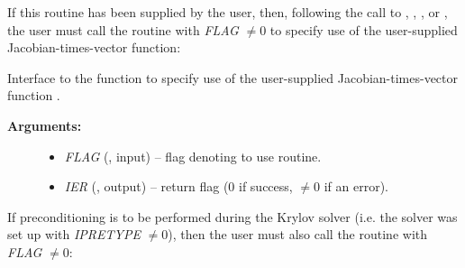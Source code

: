 \documentclass[letterpaper,10pt,english]{sphinxmanual}
\begin{document}
If this routine has been supplied by the user, then, following the
call to {\hyperref[f_interface/Usage:f/_/FARKSPGMR]{}}, {\hyperref[f_interface/Usage:f/_/FARKSPBCG]{}},
{\hyperref[f_interface/Usage:f/_/FARKSPTFQMR]{}}, {\hyperref[f_interface/Usage:f/_/FARKSPFGMR]{}} or
{\hyperref[f_interface/Usage:f/_/FARKPCG]{}}, the user must call the routine
{\hyperref[f_interface/Usage:f/_/FARKSPILSSETJAC]{}} with \emph{FLAG} $\ne 0$ to specify use
of the user-supplied Jacobian-times-vector function:

\begin{fulllineitems}
\label{f_interface/Usage:f/_/FARKSPILSSETJAC}
Interface to the function {\hyperref[c_interface/User_callable:ARKSpilsSetJacTimesVecFn]{}} to
specify use of the user-supplied Jacobian-times-vector function
{\hyperref[f_interface/Usage:f/_/FARKJTIMES]{}}.
\begin{description}
\item[{\textbf{Arguments:}}] \leavevmode\begin{itemize}
\item {} 
\emph{FLAG} (, input) -- flag denoting to use
{\hyperref[f_interface/Usage:f/_/FARKJTIMES]{}} routine.

\item {} 
\emph{IER}  (, output) -- return flag  (0 if success,
$\ne 0$ if an error).

\end{itemize}

\end{description}

\end{fulllineitems}


If preconditioning is to be performed during the Krylov solver
(i.e. the solver was set up with \emph{IPRETYPE} $\ne 0$), then the
user must also call the routine {\hyperref[f_interface/Usage:f/_/FARKSPILSSETPREC]{}} with
\emph{FLAG} $\ne 0$:
\end{document}
